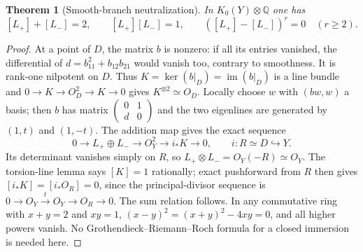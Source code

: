 \documentclass[11pt]{article}
\newtheorem{theorem}{Theorem}[section]
\begin{document}
\begin{theorem}[Smooth-branch neutralization]
In $K_0(Y)\otimes\mathbb Q$ one has
\[
 [L_+]+[L_-]=2,\qquad [L_+][L_-]=1,\qquad
 ([L_+]-[L_-])^r=0\quad(r\ge2).
\]
\end{theorem}
\begin{proof}
At a point of $D$, the matrix $b$ is nonzero: if all its entries vanished,
the differential of $d=b_{11}^2+b_{12}b_{21}$ would vanish too, contrary to
smoothness. It is rank-one nilpotent on $D$. Thus
$K=\ker(b|_D)=\operatorname{im}(b|_D)$ is a line bundle and
$0\to K\to O_D^2\to K\to0$ gives $K^{\otimes2}\simeq O_D$.
Locally choose $w$ with $(bw,w)$ a basis; then $b$ has matrix
$\left(\begin{smallmatrix}0&1\\d&0\end{smallmatrix}\right)$ and the two
eigenlines are generated by $(1,t)$ and $(1,-t)$. The addition map gives
the exact sequence
\[
 0\to L_+\oplus L_-\to O_Y^2\to i_*K\to0,
 \qquad i:R\simeq D\hookrightarrow Y.
\]
Its determinant vanishes simply on $R$, so
$L_+\otimes L_-=O_Y(-R)\simeq O_Y$.
The torsion-line lemma says $[K]=1$ rationally; exact pushforward from $R$
then gives $[i_*K]=[i_*O_R]=0$, since the principal-divisor sequence is
$0\to O_Y\xrightarrow{t}O_Y\to O_R\to0$.
The sum relation follows. In any commutative ring with $x+y=2$ and $xy=1$,
$(x-y)^2=(x+y)^2-4xy=0$, and all higher powers vanish.
No Grothendieck--Riemann--Roch formula for a closed immersion is needed here.
\end{proof}
\end{document}
